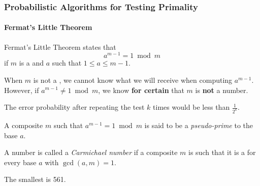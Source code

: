 \subsubsection{Probabilistic Algorithms for Testing Primality}\label{subsubsec:Probabilistic_Algorithms_Testing_Primality}
\paragraph{Fermat's Little Theorem}\label{par:Fermats_Little_Theorem}
\begin{theorem}\label{thm:Fermats_Little_Theorem}
  Fermat's Little Theorem states that
  \begin{equation}\label{eq:Fermats_Little_Theorem}
    a^{m-1} = 1 \bmod m
  \end{equation}
  if $m$ is a  and $a$ such that $1 \leq a \leq m-1$.

  When $m$ is not a , we cannot know what we will receive when computing $a^{m-1}$.
  However, if $a^{m-1} \neq 1 \bmod m$, we know \textbf{for certain} that $m$ is \textbf{not} a  number.
\end{theorem}

\begin{remark*}
  The error probability after repeating the test $k$ times would be less than $\frac{1}{2^{k}}$.
\end{remark*}

\begin{definition}\label{def:Pseudo_Prime}
  A composite $m$ such that $a^{m-1} = 1 \bmod m$ is said to be a \emph{pseudo-prime} to the base $a$.
\end{definition}

\begin{definition}\label{def:Carmichael_Number}
  A number is called a \emph{Carmichael number} if a composite $m$ is such that it is a  for every base $a$ with $\gcd(a, m) = 1$.

  \begin{remark}
    The smallest  is 561.
  \end{remark}
\end{definition}

